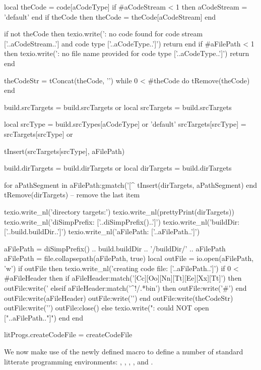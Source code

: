   local theCode = code[aCodeType]
  if #aCodeStream < 1 then aCodeStream = 'default' end
  if theCode then theCode = theCode[aCodeStream] end

  if not theCode then
    texio.write('\nERROR: no code found for code stream ['..aCodeStream..'] and code type ['..aCodeType..']\n\n')
    return
  end
  if #aFilePath < 1 then
    texio.write('\nERROR: no file name provided for code type ['..aCodeType..']\n\n')
    return
  end

  theCodeStr = tConcat(theCode, '\n\n')
  while 0 < #theCode do tRemove(theCode) end

  build.srcTargets = build.srcTargets or { }
  local srcTargets = build.srcTargets

  local srcType       = build.srcTypes[aCodeType] or 'default'
  srcTargets[srcType] = srcTargets[srcType] or { }

  tInsert(srcTargets[srcType], aFilePath)

  build.dirTargets = build.dirTargets or { }
  local dirTargets = build.dirTargets
  
  for aPathSegment in aFilePath:gmatch('[^%
    tInsert(dirTargets, aPathSegment)
  end
  tRemove(dirTargets) -- remove the last item
  
  texio.write_nl('directory targets:')
  texio.write_nl(prettyPrint(dirTargets))
  texio.write_nl('diSimpPrefix: ['..diSimpPrefix()..']')
  texio.write_nl('buildDir: ['..build.buildDir..']')
  texio.write_nl('aFilePath: ['..aFilePath..']')

  aFilePath = diSimpPrefix() .. build.buildDir .. '/buildDir/' .. aFilePath
  aFilePath = file.collapsepath(aFilePath, true)
  local outFile = io.open(aFilePath, 'w')
  if outFile then
    texio.write_nl('creating code file: ['..aFilePath..']')
    if 0 < #aFileHeader then
      if aFileHeader:match('[Cc][Oo][Nn][Tt][Ee][Xx][Tt]') then
        outFile:write('%
      elseif aFileHeader:match('^!/.*bin') then
        outFile:write('#')
      end
      outFile:write(aFileHeader)
      outFile:write('\n\n')
    end
    outFile:write(theCodeStr)
    outFile:write('\n\n')
    outFile:close()
  else
    texio.write("\nERROR: could NOT open ["..aFilePath.."]\n")
  end
end

litProgs.createCodeFile = createCodeFile
\stopLuaCode

\stopTestSuite

We now make use of the newly defined  macro to 
define a number of standard litterate programming environments: 
, , , , 
 and . 

